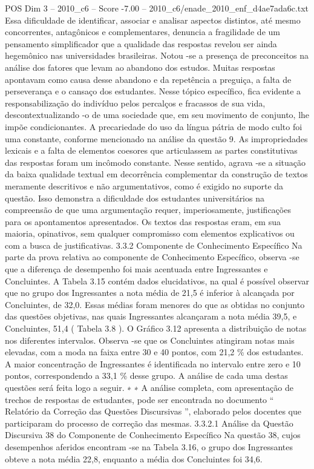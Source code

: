 \begin{textsample}{POS Dim 3 – 2010\_c6 – Score -7.00 – 2010\_c6/enade\_2010\_enf\_d4ae7ada6c.txt}
Essa dificuldade de identificar, associar e analisar aspectos distintos, até mesmo concorrentes, antagônicos e complementares, denuncia a fragilidade de um pensamento simplificador que a qualidade das respostas revelou ser ainda hegemônico nas universidades brasileiras.
Notou -se a presença de preconceitos na análise dos fatores que levam ao abandono dos estudos.
Muitas respostas apontavam como causa desse abandono e da repetência a preguiça, a falta de perseverança e o cansaço dos estudantes.
Nesse tópico específico, fica evidente a responsabilização do indivíduo pelos percalços e fracassos de sua vida, descontextualizando -o de uma sociedade que, em seu movimento de conjunto, lhe impõe condicionantes.
A precariedade do uso da língua pátria de modo culto foi uma constante, conforme mencionado na análise da questão 9.
As impropriedades lexicais e a falta de elementos coesores que articulassem as partes constitutivas das respostas foram um incômodo constante.
Nesse sentido, agrava -se a situação da baixa qualidade textual em decorrência complementar da construção de textos meramente descritivos e não argumentativos, como é exigido no suporte da questão.
Isso demonstra a dificuldade dos estudantes universitários na compreensão de que uma argumentação requer, imperiosamente, justificações para os apontamentos apresentados.
Os textos das respostas eram, em sua maioria, opinativos, sem qualquer compromisso com elementos explicativos ou com a busca de justificativas. 3.3.2 Componente de Conhecimento Específico Na parte da prova relativa ao componente de Conhecimento Específico, observa -se que a diferença de desempenho foi mais acentuada entre Ingressantes e Concluintes.
A Tabela 3.15 contém dados elucidativos, na qual é possível observar que no grupo dos Ingressantes a nota média de 21,5 é inferior à alcançada por Concluintes, de 32,0.
Essas médias foram menores do que as obtidas no conjunto das questões objetivas, nas quais Ingressantes alcançaram a nota média 39,5, e Concluintes, 51,4 ( Tabela 3.8 ).
O Gráfico 3.12 apresenta a distribuição de notas nos diferentes intervalos.
Observa -se que os Concluintes atingiram notas mais elevadas, com a moda na faixa entre 30 e 40 pontos, com 21,2 \% dos estudantes.
A maior concentração de Ingressantes é identificada no intervalo entre zero e 10 pontos, correspondendo a 33,1 \% desse grupo.
A análise de cada uma destas questões será feita logo a seguir. ∗ ∗ A análise completa, com apresentação de trechos de respostas de estudantes, pode ser encontrada no documento “ Relatório da Correção das Questões Discursivas ”, elaborado pelos docentes que participaram do processo de correção das mesmas. 3.3.2.1 Análise da Questão Discursiva 38 do Componente de Conhecimento Específico Na questão 38, cujos desempenhos aferidos encontram -se na Tabela 3.16, o grupo dos Ingressantes obteve a nota média 22,8, enquanto a média dos Concluintes foi 34,6.

\end{textsample}
